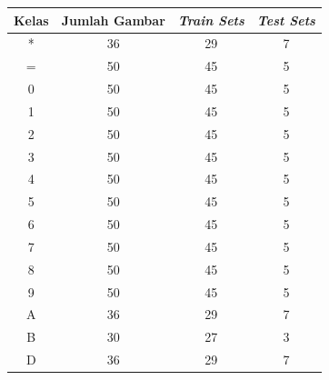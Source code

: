 \begin{center}
  \begin{longtable}{|c|c|c|c|}
    \hline
    \textbf{Kelas} & \textbf{Jumlah Gambar} & \textbf{\textit{Train Sets}} & \textbf{\textit{Test Sets}} \\ \hline
      *                                    & 36                     & 29                  & 7                  \\ \hline
      =                                    & 50                     & 45                  & 5                  \\ \hline
      0                                    & 50                     & 45                  & 5                  \\ \hline
      1                                    & 50                     & 45                  & 5                  \\ \hline
      2                                    & 50                     & 45                  & 5                  \\ \hline
      3                                    & 50                     & 45                  & 5                  \\ \hline
      4                                    & 50                     & 45                  & 5                  \\ \hline
      5                                    & 50                     & 45                  & 5                  \\ \hline
      6                                    & 50                     & 45                  & 5                  \\ \hline
      7                                    & 50                     & 45                  & 5                  \\ \hline
      8                                    & 50                     & 45                  & 5                  \\ \hline
      9                                    & 50                     & 45                  & 5                  \\ \hline
      A                                    & 36                     & 29                  & 7                  \\ \hline
      B                                    & 30                     & 27                  & 3                  \\ \hline
      D                                    & 36                     & 29                  & 7                  \\ \hline

\end{longtable}
\end{center}
